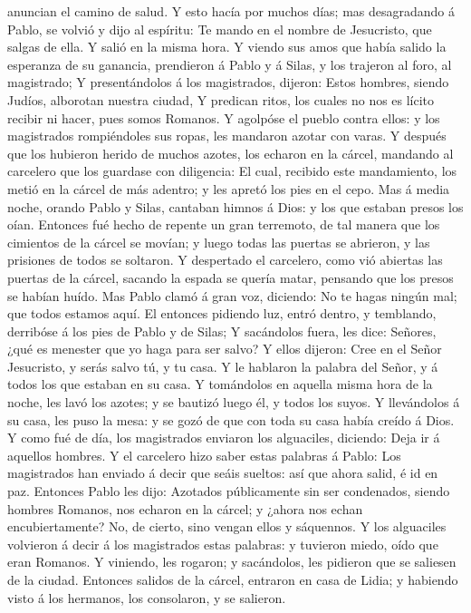 anuncian el camino de salud.  Y esto hacía por muchos días;
mas desagradando á Pablo, se volvió y dijo al espíritu: Te mando en el
nombre de Jesucristo, que salgas de ella. Y salió en la misma hora.
 Y viendo sus amos que había salido la esperanza de su
ganancia, prendieron á Pablo y á Silas, y los trajeron al foro, al
magistrado;  Y presentándolos á los magistrados, dijeron:
Estos hombres, siendo Judíos, alborotan nuestra ciudad,  Y
predican ritos, los cuales no nos es lícito recibir ni hacer, pues somos
Romanos.  Y agolpóse el pueblo contra ellos: y los
magistrados rompiéndoles sus ropas, les mandaron azotar con varas.
 Y después que los hubieron herido de muchos azotes, los
echaron en la cárcel, mandando al carcelero que los guardase con
diligencia:  El cual, recibido este mandamiento, los metió
en la cárcel de más adentro; y les apretó los pies en el cepo.
 Mas á media noche, orando Pablo y Silas, cantaban himnos á
Dios: y los que estaban presos los oían.  Entonces fué
hecho de repente un gran terremoto, de tal manera que los cimientos de
la cárcel se movían; y luego todas las puertas se abrieron, y las
prisiones de todos se soltaron.  Y despertado el carcelero,
como vió abiertas las puertas de la cárcel, sacando la espada se quería
matar, pensando que los presos se habían huído.  Mas Pablo
clamó á gran voz, diciendo: No te hagas ningún mal; que todos estamos
aquí.  El entonces pidiendo luz, entró dentro, y temblando,
derribóse á los pies de Pablo y de Silas;  Y sacándolos
fuera, les dice: Señores, ¿qué es menester que yo haga para ser salvo?
 Y ellos dijeron: Cree en el Señor Jesucristo, y serás
salvo tú, y tu casa.  Y le hablaron la palabra del Señor, y
á todos los que estaban en su casa.  Y tomándolos en
aquella misma hora de la noche, les lavó los azotes; y se bautizó luego
él, y todos los suyos.  Y llevándolos á su casa, les puso
la mesa: y se gozó de que con toda su casa había creído á Dios.
 Y como fué de día, los magistrados enviaron los
alguaciles, diciendo: Deja ir á aquellos hombres.  Y el
carcelero hizo saber estas palabras á Pablo: Los magistrados han enviado
á decir que seáis sueltos: así que ahora salid, é id en paz.
 Entonces Pablo les dijo: Azotados públicamente sin ser
condenados, siendo hombres Romanos, nos echaron en la cárcel; y ¿ahora
nos echan encubiertamente? No, de cierto, sino vengan ellos y sáquennos.
 Y los alguaciles volvieron á decir á los magistrados estas
palabras: y tuvieron miedo, oído que eran Romanos.  Y
viniendo, les rogaron; y sacándolos, les pidieron que se saliesen de la
ciudad.  Entonces salidos de la cárcel, entraron en casa de
Lidia; y habiendo visto á los hermanos, los consolaron, y se salieron.


